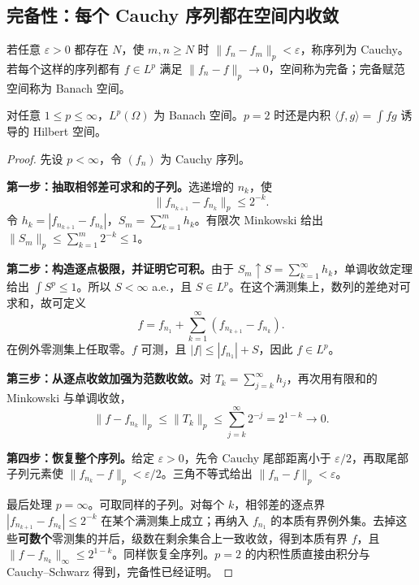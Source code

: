 \subsection{完备性：每个 Cauchy 序列都在空间内收敛}

\begin{definition}
若任意 $\varepsilon>0$ 都存在 $N$，使 $m,n\ge N$ 时 $\|f_n-f_m\|_p<\varepsilon$，称序列为 Cauchy。若每个这样的序列都有 $f\in L^p$ 满足 $\|f_n-f\|_p\to0$，空间称为完备；完备赋范空间称为 Banach 空间。
\end{definition}

\begin{theorem}[$L^p$ 完备性]\label{thm:lp-complete}
对任意 $1\le p\le\infty$，$L^p(\Omega)$ 为 Banach 空间。$p=2$ 时还是内积 $\langle f,g\rangle=\int fg$ 诱导的 Hilbert 空间。
\end{theorem}
\begin{proof}
先设 $p<\infty$，令 $(f_n)$ 为 Cauchy 序列。

\textbf{第一步：抽取相邻差可求和的子列。}选递增的 $n_k$，使
\[
 \|f_{n_{k+1}}-f_{n_k}\|_p\le2^{-k}.
\]
令 $h_k=|f_{n_{k+1}}-f_{n_k}|$，$S_m=\sum_{k=1}^mh_k$。有限次 Minkowski 给出 $\|S_m\|_p\le\sum_{k=1}^m2^{-k}\le1$。

\textbf{第二步：构造逐点极限，并证明它可积。}由于 $S_m\uparrow S=\sum_{k=1}^\infty h_k$，单调收敛定理给出 $\int S^p\le1$。所以 $S<\infty$ a.e.，且 $S\in L^p$。在这个满测集上，数列的差绝对可求和，故可定义
\[
 f=f_{n_1}+\sum_{k=1}^\infty(f_{n_{k+1}}-f_{n_k}).
\]
在例外零测集上任取零。$f$ 可测，且 $|f|\le|f_{n_1}|+S$，因此 $f\in L^p$。

\textbf{第三步：从逐点收敛加强为范数收敛。}对 $T_k=\sum_{j=k}^\infty h_j$，再次用有限和的 Minkowski 与单调收敛，
\[
 \|f-f_{n_k}\|_p\le\|T_k\|_p
 \le\sum_{j=k}^\infty2^{-j}=2^{1-k}\longrightarrow0.
\]

\textbf{第四步：恢复整个序列。}给定 $\varepsilon>0$，先令 Cauchy 尾部距离小于 $\varepsilon/2$，再取尾部子列元素使 $\|f_{n_k}-f\|_p<\varepsilon/2$。三角不等式给出 $\|f_n-f\|_p<\varepsilon$。

最后处理 $p=\infty$。可取同样的子列。对每个 $k$，相邻差的逐点界 $|f_{n_{k+1}}-f_{n_k}|\le2^{-k}$ 在某个满测集上成立；再纳入 $f_{n_1}$ 的本质有界例外集。去掉这些\textbf{可数个}零测集的并后，级数在剩余集合上一致收敛，得到本质有界 $f$，且 $\|f-f_{n_k}\|_\infty\le2^{1-k}$。同样恢复全序列。$p=2$ 的内积性质直接由积分与 Cauchy--Schwarz 得到，完备性已经证明。
\end{proof}

